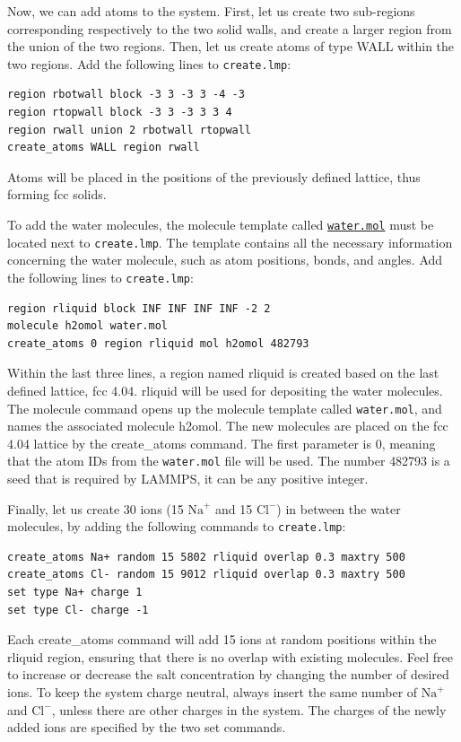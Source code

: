 \documentclass[9pt,tutorial]{livecoms}
\newcommand{\lmpcmd}[1]{\hspace{0pt}\colorbox{listing}{\textcolor{command}{\small{#1}}}\hspace{0pt}} %
\newcommand{\flecmd}[1]{\textcolor{command}{\texttt{#1}}} %
\newcommand{\dwlcmd}[1]{\textcolor{download}{\texttt{#1}}} %
\newcommand{\filepath}{https://raw.githubusercontent.com/lammpstutorials/lammpstutorials-article/main/files/}
\begin{document}
Now, we can add atoms to the system.  First, let us create two sub-regions corresponding
respectively to the two solid walls, and create a larger region from the union of the
two regions.  Then, let us create atoms of type WALL within the two regions.  Add the
following lines to \flecmd{create.lmp}:
\begin{lstlisting}
region rbotwall block -3 3 -3 3 -4 -3
region rtopwall block -3 3 -3 3 3 4
region rwall union 2 rbotwall rtopwall
create_atoms WALL region rwall
\end{lstlisting}
Atoms will be placed in the positions of the previously defined lattice, thus
forming fcc solids.

To add the water molecules, the molecule
template called \href{\filepath tutorial4/water.mol}{\dwlcmd{water.mol}}
must be located next to \flecmd{create.lmp}.  The template contains all the
necessary information concerning the water molecule, such as atom positions,
bonds, and angles.  Add the following lines to \flecmd{create.lmp}:
\begin{lstlisting}
region rliquid block INF INF INF INF -2 2
molecule h2omol water.mol
create_atoms 0 region rliquid mol h2omol 482793
\end{lstlisting}
Within the last three lines, a \lmpcmd{region} named \lmpcmd{rliquid} is
created based on the last defined lattice, \lmpcmd{fcc 4.04}.  \lmpcmd{rliquid}
will be used for depositing the water molecules.  The \lmpcmd{molecule} command
opens up the molecule template called \flecmd{water.mol}, and names the
associated molecule \lmpcmd{h2omol}.  The new molecules are placed on the
\lmpcmd{fcc 4.04} lattice by the \lmpcmd{create\_atoms} command.  The first
parameter is 0, meaning that the atom IDs from the \flecmd{water.mol} file
will be used.  The number \lmpcmd{482793} is a seed that is required by LAMMPS,
it can be any positive integer.

Finally, let us create 30 ions (15 $\text{Na}^+$ and 15 $\text{Cl}^-$) in between
the water molecules, by adding the following commands to \flecmd{create.lmp}:
\begin{lstlisting}
create_atoms Na+ random 15 5802 rliquid overlap 0.3 maxtry 500
create_atoms Cl- random 15 9012 rliquid overlap 0.3 maxtry 500
set type Na+ charge 1
set type Cl- charge -1
\end{lstlisting}
Each \lmpcmd{create\_atoms} command will add 15 ions at random positions
within the \lmpcmd{rliquid} region, ensuring that there is no \lmpcmd{overlap}
with existing molecules.  Feel free to increase or decrease the salt concentration
by changing the number of desired ions.  To keep the system charge neutral,
always insert the same number of $\text{Na}^+$ and $\text{Cl}^-$, unless there
are other charges in the system.  The charges of the newly added ions are specified
by the two \lmpcmd{set} commands.
\end{document}
